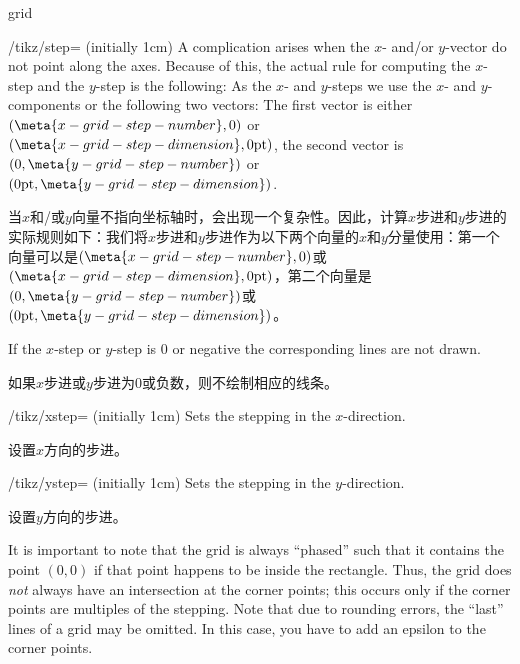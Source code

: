\begin{pathoperation}{grid}{}
\begin{key}{/tikz/step= (initially 1cm)}
        A complication arises when the $x$- and/or $y$-vector do not point
        along the axes. Because of this, the actual rule for computing the
        $x$-step and the $y$-step is the following: As the $x$- and $y$-steps
        we use the $x$- and $y$-components or the following two vectors: The
        first vector is either $(\meta{x-grid-step-number},0)$ or
        $(\meta{x-grid-step-dimension},0\mathrm{pt})$, the second vector is
        $(0,\meta{y-grid-step-number})$ or
        $(0\mathrm{pt},\meta{y-grid-step-dimension})$.

        当$x$和/或$y$向量不指向坐标轴时，会出现一个复杂性。因此，计算$x$步进和$y$步进的实际规则如下：我们将$x$步进和$y$步进作为以下两个向量的$x$和$y$分量使用：第一个向量可以是$(\meta{x-grid-step-number},0)$或$(\meta{x-grid-step-dimension},0\mathrm{pt})$，第二个向量是$(0,\meta{y-grid-step-number})$或$(0\mathrm{pt},\meta{y-grid-step-dimension})$。

        If the $x$-step or $y$-step is $0$ or negative the corresponding lines
        are not drawn.

        如果$x$步进或$y$步进为$0$或负数，则不绘制相应的线条。
    \end{key}

    \begin{key}{/tikz/xstep= (initially 1cm)}
        Sets the stepping in the $x$-direction.

        设置$x$方向的步进。
\begin{codeexample}[]
\end{codeexample}
    \end{key}

    \begin{key}{/tikz/ystep= (initially 1cm)}
        Sets the stepping in the $y$-direction.

        设置$y$方向的步进。
    \end{key}

    It is important to note that the grid is always ``phased'' such that it
    contains the point $(0,0)$ if that point happens to be inside the
    rectangle. Thus, the grid does \emph{not} always have an intersection at
    the corner points; this occurs only if the corner points are multiples of
    the stepping. Note that due to rounding errors, the ``last'' lines of a
    grid may be omitted. In this case, you have to add an epsilon to the corner
    points.


\end{pathoperation}
